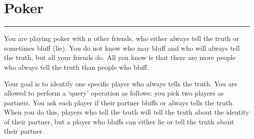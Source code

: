 \documentclass{article}
\begin{document}
\newpage
\section*{Poker}
\hrule

You are playing poker with n other friends, who either always tell the truth or sometimes bluff (lie). You do not know who may bluff and who will always tell the truth, but all your friends do. All you know is that there are more people who always tell the truth than people who bluff.

Your goal is to identify one specific player who always tells the truth.
You are allowed to perform a ‘query’ operation as follows: you pick two players as partners. You ask each player if their partner bluffs or always tells the truth. When you do this, players who tell the truth will tell the truth about the identity of their partner, but a player who bluffs can either lie or tell the truth about their partner.
\end{document}
